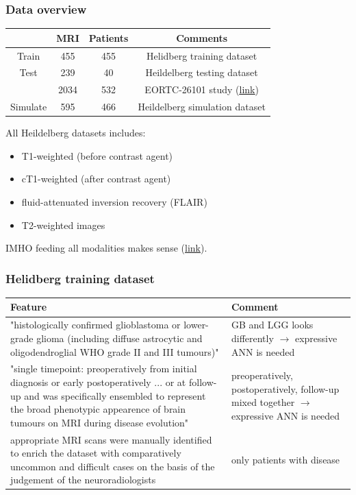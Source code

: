 \documentclass{beamer}
\begin{document}
\begin{frame}
\frametitle{Data overview}
\begin{center}
	\begin{tabular}{|c | c | c | c |} 
		\hline
		 & MRI & Patients & Comments \\
		 \hline
		 Train & 455 & 455 & Helidberg training dataset \\
		 \hline
		 Test & 239 & 40 & Heildelberg testing dataset \\
		  & 2034 & 532 & EORTC-26101 study (\href{https://clinicaltrials.gov/ct2/show/NCT01290939}{\color{blue}\underline{link}}) \\
		  \hline
		  Simulate & 595 & 466 & Heildelberg simulation dataset \\
		  \hline
	\end{tabular}
\end{center}

All Heildelberg datasets includes:
\begin{itemize}
	\item T1-weighted (before contrast agent)
	\item cT1-weighted (after contrast agent)
	\item fluid-attenuated inversion recovery (FLAIR)
	\item T2-weighted images
\end{itemize}
IMHO feeding all modalities makes sense (\href{https://openreview.net/pdf?id=Bygh9j09KX}{{\color{blue}\underline{link}}}).
\end{frame}


\begin{frame}
\frametitle{Helidberg training dataset}
\begin{center}
	\begin{tabular}{ p{7.0cm} | p{3.5cm} } 
		\hline
		Feature & Comment\\ [0.5ex]
		\hline\hline
		"histologically confirmed glioblastoma or lower-grade glioma (including diffuse astrocytic and oligodendroglial WHO grade II and III tumours)" & GB and LGG looks differently $\rightarrow$ expressive ANN is needed\\
		\hline
		"single timepoint: preoperatively from initial diagnosis or early postoperatively ... or at follow-up and was specifically ensembled to represent the broad phenotypic appearence of brain tumours on MRI during disease evolution" & preoperatively, postoperatively, follow-up mixed  together $\rightarrow$ expressive ANN is needed\\
		\hline
		appropriate MRI scans were manually identified to enrich the dataset with comparatively uncommon and difficult cases on the basis of the judgement of the neuroradiologists & only patients with disease\\
		\hline
		\hline
	\end{tabular}
\end{center}
\end{frame}
\end{document}

